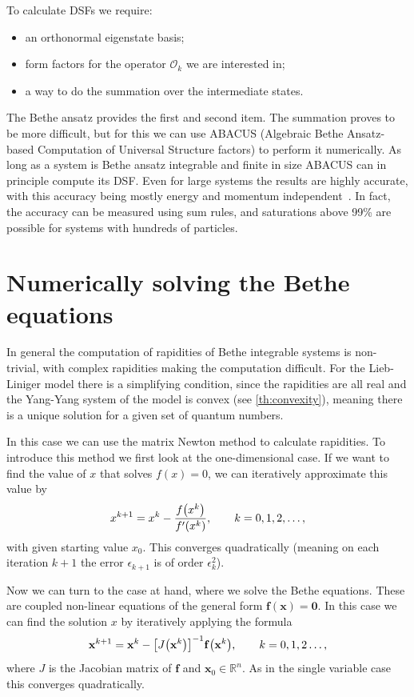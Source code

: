 \documentclass[11pt, a4paper]{report} %
\begin{document}
To calculate DSFs we require:
\begin{itemize}
  \item an orthonormal eigenstate basis;
  \item form factors for the operator $\mathcal{O}_k$ we are interested in;
  \item a way to do the summation over the intermediate states.
\end{itemize}
The Bethe ansatz provides the first and second item.
The summation proves to be more difficult, but for this we can use ABACUS (Algebraic Bethe Ansatz-based Computation of Universal Structure factors) to perform it numerically.
As long as a system is Bethe ansatz integrable and finite in size ABACUS can in principle compute its DSF.\@
Even for large systems the results are highly accurate, with this accuracy being mostly energy and momentum independent~\cite{Caux2009}.
In fact, the accuracy can be measured using sum rules, and saturations above 99\% are possible for systems with hundreds of particles.


\section{Numerically solving the Bethe equations}\label{sec:numer-solv-bethe}

In general the computation of rapidities of Bethe integrable systems is non-trivial, with complex rapidities making the computation difficult.
For the Lieb-Liniger model there is a simplifying condition, since the rapidities are all real and the Yang-Yang system of the model is convex (see \cref{th:convexity}), meaning there is a unique solution for a given set of quantum numbers.

In this case we can use the matrix Newton method to calculate rapidities.
To introduce this method we first look at the one-dimensional case.
If we want to find the value of \(x\) that solves \(f(x)=0\), we can iteratively approximate this value by 
\begin{equation}
  x^{k+1} = x^k - \frac{f\qty(x^k)}{f'\qty(x^k)}, \qquad k = 0, 1, 2, \ldots,
\end{equation}
with given starting value \(x_0\).
This converges quadratically (meaning on each iteration \(k+1\) the error \(\epsilon_{k+1}\) is of order \(\epsilon_k^2\)).

Now we can turn to the case at hand, where we solve the Bethe equations.
These are coupled non-linear equations of the general form \(\mathbf{f(x)=0}\).
In this case we can find the solution \(x\) by iteratively applying the formula
\begin{equation}
  \mathbf{x}^{k+1} = \mathbf{x}^k - {\qty[J\qty(\mathbf{x}^k)]}^{-1}\mathbf{f}\qty(\mathbf{x}^k), \qquad k=0,1,2\ldots,
\end{equation}
where \(J\) is the Jacobian matrix of \(\mathbf{f}\) and \(\mathbf{x}_0 \in \mathbb{R}^n\).
As in the single variable case this converges quadratically.
\end{document}
